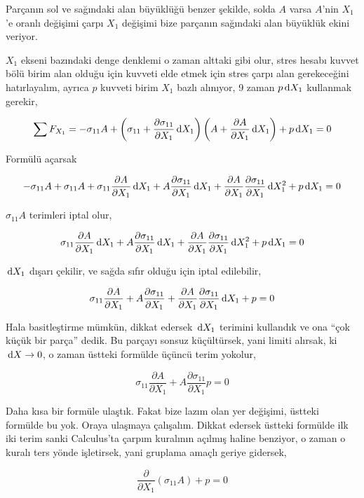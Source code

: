\documentclass[12pt,fleqn]{article}\usepackage{../../common}
\begin{document}
Parçanın sol ve sağındaki alan büyüklüğü benzer şekilde, solda $A$ varsa
$A$'nin $X_1$'e oranlı değişimi çarpı $X_1$ değişimi bize parçanın sağındaki
alan büyüklük ekini veriyor. 

$X_1$ ekseni bazındaki denge denklemi o zaman alttaki gibi olur, stres hesabı
kuvvet bölü birim alan olduğu için kuvveti elde etmek için stres çarpı alan
gerekeceğini hatırlayalım, ayrıca $p$ kuvveti birim $X_1$ bazlı alınıyor,
9 zaman $p \,\mathrm{d} X_1$ kullanmak gerekir,

$$ \sum F_{X_1} = - \sigma_{11} A +
\left( \sigma_{11} + \frac{\partial \sigma_{11}}{\partial X_1} \,\mathrm{d} X_1  \right)
\left( A + \frac{\partial A}{\partial X_1} \,\mathrm{d} X_1  \right) + p \,\mathrm{d} X_1 = 0
$$

Formülü açarsak

$$
-\sigma_{11} A  + \sigma_{11} A  +
\sigma_{11} \frac{\partial A}{\partial X_1} \,\mathrm{d} X_1 +
A \frac{\partial \sigma_{11}}{\partial X_1} \,\mathrm{d} X_1 +
\frac{\partial A}{\partial X_1} \frac{\partial \sigma_{11}}{\partial X_1} \,\mathrm{d} X_1^2 +
p \,\mathrm{d} X_1 = 0
$$

$\sigma_{11} A$ terimleri iptal olur,

$$
\sigma_{11} \frac{\partial A}{\partial X_1} \,\mathrm{d} X_1 +
A \frac{\partial \sigma_{11}}{\partial X_1} \,\mathrm{d} X_1 +
\frac{\partial A}{\partial X_1} \frac{\partial \sigma_{11}}{\partial X_1} \,\mathrm{d} X_1^2 +
p \,\mathrm{d} X_1 = 0
$$

$\,\mathrm{d} X_1$ dışarı çekilir, ve sağda sıfır olduğu için iptal edilebilir,

$$
\sigma_{11} \frac{\partial A}{\partial X_1}  +
A \frac{\partial \sigma_{11}}{\partial X_1}  +
\frac{\partial A}{\partial X_1} \frac{\partial \sigma_{11}}{\partial X_1} \,\mathrm{d} X_1 +
p  = 0
$$

Hala basitleştirme mümkün, dikkat edersek $\,\mathrm{d} X_1$ terimini kullandık ve
ona ``çok küçük bir parça'' dedik. Bu parçayı sonsuz küçültürsek, yani
limiti alırsak, ki $\,\mathrm{d} X \to 0$, o zaman üstteki formülde üçüncü terim
yokolur,

$$
\sigma_{11} \frac{\partial A}{\partial X_1}  +
A \frac{\partial \sigma_{11}}{\partial X_1}  
p  = 0
$$

Daha kısa bir formüle ulaştık. Fakat bize lazım olan yer değişimi, üstteki
formülde bu yok. Oraya ulaşmaya çalışalım. Dikkat edersek üstteki formülde
ilk iki terim sanki Calculus'ta çarpım kuralının açılmış haline benziyor,
o zaman o kuralı ters yönde işletirsek, yani gruplama amaçlı geriye gidersek,

$$
\frac{\partial }{\partial X_1} (\sigma_{11} A ) + p = 0
$$
\end{document}
